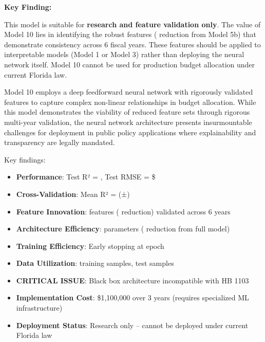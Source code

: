 \begin{tcolorbox}[colback=red!10!white, colframe=red!75!black, title=\textbf{REGULATORY WARNING: NOT COMPLIANT}]
\vspace{0.1cm}

\textbf{Key Finding:} \ModelTenBlackBoxWarning{}

\vspace{0.1cm}

This model is suitable for \textbf{research and feature validation only}. The value of Model 10 lies in identifying the \ModelTenRobustFeatures{} robust features (\ModelTenFeatureReduction{} reduction from Model 5b) that demonstrate consistency across 6 fiscal years. These features should be applied to interpretable models (Model 1 or Model 3) rather than deploying the neural network itself. Model 10 cannot be used for production budget allocation under current Florida law.
\end{tcolorbox}

Model 10 employs a deep feedforward neural network with \ModelTenRobustFeatures{} rigorously validated features to capture complex non-linear relationships in budget allocation. While this model demonstrates the viability of reduced feature sets through rigorous multi-year validation, the neural network architecture presents insurmountable challenges for deployment in public policy applications where explainability and transparency are legally mandated.

Key findings:
\begin{itemize}
    \item \textbf{Performance}: Test R² = \ModelTenRSquaredTest{}, Test RMSE = \$\ModelTenRMSETest{}
    \item \textbf{Cross-Validation}: Mean R² = \ModelTenCVMean{} (±\ModelTenCVStd{})
    \item \textbf{Feature Innovation}: \ModelTenRobustFeatures{} features (\ModelTenFeatureReduction{} reduction) validated across 6 years
    \item \textbf{Architecture Efficiency}: \ModelTenTotalParams{} parameters (\ModelTenParameterReduction{} reduction from full model)
    \item \textbf{Training Efficiency}: Early stopping at epoch \ModelTenEpochsStopped{}
    \item \textbf{Data Utilization}: \ModelTenTrainingSamples{} training samples, \ModelTenTestSamples{} test samples
    \item \textbf{CRITICAL ISSUE}: Black box architecture incompatible with HB 1103
    \item \textbf{Implementation Cost}: \$1,100,000 over 3 years (requires specialized ML infrastructure)
    \item \textbf{Deployment Status}: Research only -- cannot be deployed under current Florida law
\end{itemize}

